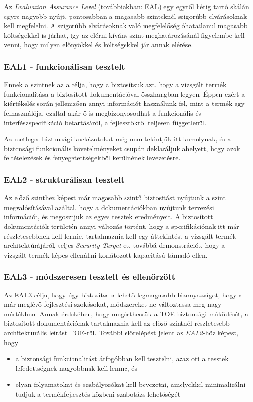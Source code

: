 Az \emph{Evaluation Assurance Level} (továbbiakban: EAL) egy egytől hétig tartó skálán egyre nagyobb
nyújt, pontosabban a magasabb szinteknél szigorúbb elvárásoknak kell megfelelni. A szigorúbb
elvárásoknak való megfelelőség óhatatlanul magasabb költségekkel is járhat, így az elérni kívánt
szint meghatározásánál figyelembe kell venni, hogy milyen előnyökkel és költségekkel jár annak
elérése.

\subsubsection{EAL1 - funkcionálisan tesztelt}
Ennek a szintnek az a célja, hogy a biztosítsuk azt, hogy a vizsgált termék funkcionalitása
a biztosított dokumentációval összhangban legyen. Éppen ezért a kiértékelés során jellemzően annyi
információt használunk fel, mint a termék egy felhasználója, ezáltal akár ő is megbizonyosodhat
a funkcionális és interfészspecifikáció betartásáról, a fejlesztőktől teljesen függetlenül.

Az esetleges biztonsági kockázatokat még nem tekintjük itt komolynak, és a biztonsági funkcionális
követelményeket csupán deklaráljuk ahelyett, hogy azok feltételezések és fenyegetettségekből
kerülnének levezetésre.

\subsubsection{EAL2 - strukturálisan tesztelt}
Az előző szinthez képest már magasabb szintű biztosítást nyújtunk a szint megvalósításával azáltal,
hogy a dokumentációkban nyújtunk tervezési információt, és megosztjuk az egyes tesztek eredményeit.
A biztosított dokumentációk területén annyi változás történt, hogy a specifikációnak itt már
részletesebbnek kell lennie, tartalmaznia kell egy áttekintést a vizsgált termék architektúrájáról,
teljes \emph{Security Target}-et, továbbá demonstrációt, hogy a vizsgált termék képes ellenállni
korlátozott kapacitású támadó ellen.

\subsubsection{EAL3 - módszeresen tesztelt és ellenőrzött}
Az EAL3 célja, hogy úgy biztosítsa a lehető legmagasabb bizonyosságot, hogy a már meglévő
fejlesztési szokásokat, módszereket ne változtassa meg nagy mértékben.
Annak érdekében, hogy megérthessük a TOE biztonsági működését, a biztosított dokumentációnak
tartalmaznia kell az előző szintnél részletesebb architekturális leírást TOE-ről.
További előrelépést jelent az \emph{EAL2}-höz képest, hogy
\begin{itemize}
    \item a biztonsági funkcionalitást átfogóbban kell tesztelni, azaz ott a tesztek lefedettségnek
        nagyobbnak kell lennie, és
    \item olyan folyamatokat és szabályozókat kell bevezetni, amelyekkel minimalizálni tudjuk a
        termékfejlesztés közbeni szabotázs lehetőségét.
\end{itemize}

